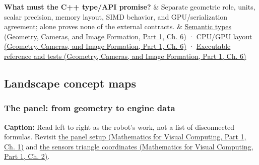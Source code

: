 {\begin{longtable}[]
\textbf{What must the C++ type/API promise?} & Separate geometric role, units, scalar precision, memory layout, SIMD behavior, and GPU/serialization agreement;  alone proves none of the external contracts. & \href{../03-Geometry-Cameras-and-Image-Formation-P01/main.pdf\#nameddest=02-foundations-ii-ch037-types-can-remember-the-promises-that-three-components-forget}{Semantic types (Geometry, Cameras, and Image Formation, Part 1, Ch. 6)} · \href{../03-Geometry-Cameras-and-Image-Formation-P01/main.pdf\#nameddest=02-foundations-ii-ch037-storage-and-computation-can-choose-different-layouts}{CPU/GPU layout (Geometry, Cameras, and Image Formation, Part 1, Ch. 6)} · \href{../03-Geometry-Cameras-and-Image-Formation-P01/main.pdf\#nameddest=02-foundations-ii-ch037-a-complete-scalar-laboratory-makes-the-story-executable}{Executable reference and tests (Geometry, Cameras, and Image Formation, Part 1, Ch. 6)} \\
\end{longtable}
}

\subsection{Landscape concept maps}\label{appendix-38d9c8aca357-landscape-concept-maps}

\hypertarget{appendix-38d9c8aca357-landscape-concept-maps}{}

\subsubsection{The panel: from geometry to engine data}\label{appendix-38d9c8aca357-the-panel-from-geometry-to-engine-data}

\hypertarget{appendix-38d9c8aca357-the-panel-from-geometry-to-engine-data}{}


\textbf{Caption:} Read left to right as the robot's work, not a list of disconnected formulas. Revisit \href{../02-Mathematics-for-Visual-Computing-P01/main.pdf\#nameddest=01-foundations-i-ch017-the-panel-gives-us-a-reason-to-learn}{the panel setup (Mathematics for Visual Computing, Part 1, Ch. 1)} and \href{../02-Mathematics-for-Visual-Computing-P01/main.pdf\#nameddest=01-foundations-i-ch018-the-sensor-needs-coordinates-inside-the-triangle}{the sensor\textquotesingle s triangle coordinates (Mathematics for Visual Computing, Part 1, Ch. 2)}.

